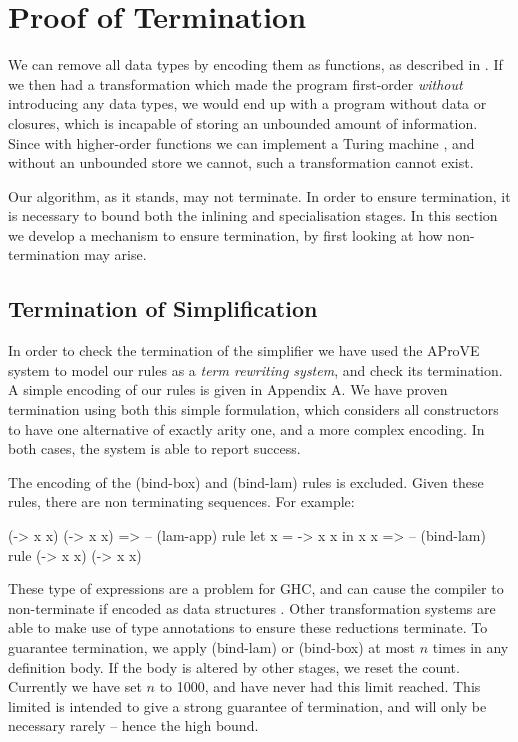 \documentclass[preprint]{sigplanconf}
\begin{document}
\section{Proof of Termination}
\label{sec:termination}

 We can remove all data types by encoding them as functions, as described in \citet{naylor:reduceron}. If we then had a transformation which made the program first-order \textit{without} introducing any data types, we would end up with a program without data or closures, which is incapable of storing an unbounded amount of information. Since with higher-order functions we can implement a Turing machine \cite{turing:halting}, and without an unbounded store we cannot, such a transformation cannot exist.


Our algorithm, as it stands, may not terminate. In order to ensure termination, it is necessary to bound both the inlining and specialisation stages. In this section we develop a mechanism to ensure termination, by first looking at how non-termination may arise.

\subsection{Termination of Simplification}
\label{sec:termination_simplification}

In order to check the termination of the simplifier we have used the AProVE system \cite{aprove} to model our rules as a \textit{term rewriting system}, and check its termination. A simple encoding of our rules is given in Appendix A. We have proven termination using both this simple formulation, which considers all constructors to have one alternative of exactly arity one, and a more complex encoding. In both cases, the system is able to report success.

The encoding of the (bind-box) and (bind-lam) rules is excluded. Given these rules, there are non terminating sequences. For example:

\ignore\begin{code}
(\x -> x x) (\x -> x x)
   => -- (lam-app) rule
let x = \x -> x x in x x
   => -- (bind-lam) rule
(\x -> x x) (\x -> x x)
\end{code}

These type of expressions are a problem for GHC, and can cause the compiler to non-terminate if encoded as data structures \cite{spj:inlining}. Other transformation systems \cite{chin:higher_order_removal} are able to make use of type annotations to ensure these reductions terminate. To guarantee termination, we apply (bind-lam) or (bind-box) at most $n$ times in any definition body. If the body is altered by other stages, we reset the count. Currently we have set $n$ to 1000, and have never had this limit reached. This limited is intended to give a strong guarantee of termination, and will only be necessary rarely -- hence the high bound.
\end{document}
